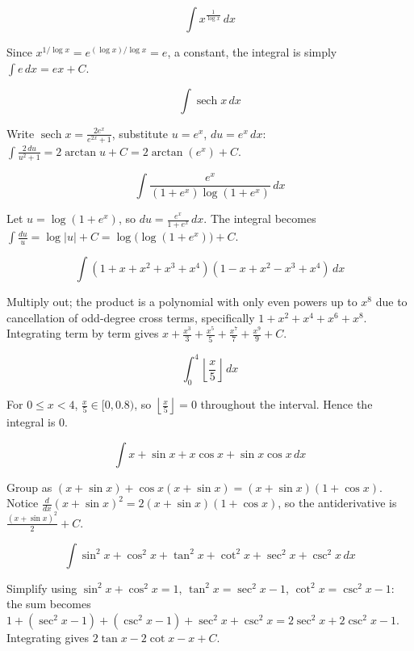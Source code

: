 \begin{questions}

\question
\[\int x^{\frac1{\log x}}\,dx\]
\begin{solution}
Since $x^{1/\log x} = e^{(\log x)/\log x} = e$, a constant, the integral is simply $\int e\,dx = ex+C$.
\end{solution}

\question
\[\int \operatorname{sech} x\,dx\]
\begin{solution}
Write $\operatorname{sech}x = \frac{2e^x}{e^{2x}+1}$, substitute $u=e^x$, $du=e^x\,dx$: $\int\frac{2\,du}{u^2+1} = 2\arctan u+C = 2\arctan(e^x)+C$.
\end{solution}

\question
\[\int \frac{e^x}{(1+e^x)\log(1+e^x)}\,dx\]
\begin{solution}
Let $u=\log(1+e^x)$, so $du = \frac{e^x}{1+e^x}\,dx$. The integral becomes $\int\frac{du}{u} = \log|u|+C = \log\big(\log(1+e^x)\big)+C$.
\end{solution}

\question
\[\int (1+x+x^2+x^3+x^4)(1-x+x^2-x^3+x^4)\,dx\]
\begin{solution}
Multiply out; the product is a polynomial with only even powers up to $x^8$ due to cancellation of odd-degree cross terms, specifically $1+x^2+x^4+x^6+x^8$. Integrating term by term gives $x+\frac{x^3}3+\frac{x^5}5+\frac{x^7}7+\frac{x^9}9+C$.
\end{solution}

\question
\[\int_0^4 \left\lfloor\frac x5\right\rfloor\,dx\]
\begin{solution}
For $0\le x<4$, $\frac x5\in[0,0.8)$, so $\left\lfloor \frac x5\right\rfloor=0$ throughout the interval. Hence the integral is $0$.
\end{solution}

\question
\[\int x+\sin x+x\cos x+\sin x\cos x\,dx\]
\begin{solution}
Group as $(x+\sin x)+\cos x(x+\sin x) = (x+\sin x)(1+\cos x)$. Notice $\frac{d}{dx}(x+\sin x)^2 = 2(x+\sin x)(1+\cos x)$, so the antiderivative is $\frac{(x+\sin x)^2}{2}+C$.
\end{solution}

\question
\[\int \sin^2x+\cos^2x+\tan^2x+\cot^2x+\sec^2x+\csc^2x\,dx\]
\begin{solution}
Simplify using $\sin^2x+\cos^2x=1$, $\tan^2x=\sec^2x-1$, $\cot^2x=\csc^2x-1$: the sum becomes $1+(\sec^2x-1)+(\csc^2x-1)+\sec^2x+\csc^2x = 2\sec^2x+2\csc^2x-1$. Integrating gives $2\tan x-2\cot x-x+C$.
\end{solution}


\end{questions}
